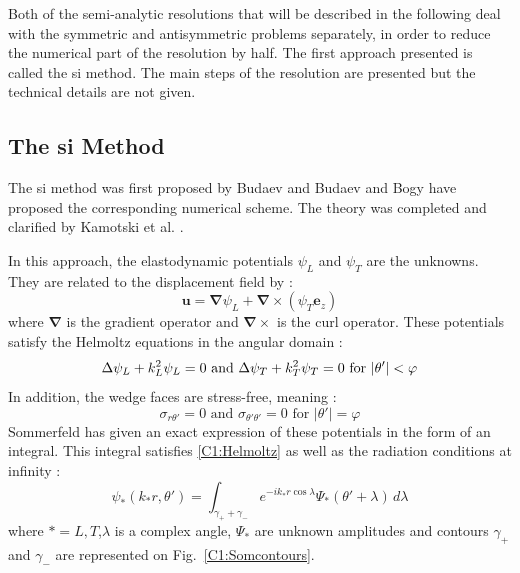 Both of the semi-analytic resolutions that will be described in the following deal with the symmetric and antisymmetric problems separately, in order to reduce the numerical part of the resolution by half. The first approach presented is called the \acrfull{si} method. The main steps of the resolution are presented but the technical details are not given.

\subsection{The \acrfull{si} Method}
The \acrfull{si} method was first proposed by Budaev \cite{BudaevBook,Budaev1,Budaev2} and Budaev and Bogy \cite{Rayleigh,Rayleigh2,Rayleigh3} have proposed the corresponding numerical scheme. The theory was completed and clarified by Kamotski et al. \cite{KamotskiFradkin}.

In this approach, the elastodynamic potentials $\psi_L$ and $\psi_T$ are the unknowns. They are related to the displacement field by :
\begin{equation}
\mathbf{u}=\mathbf{\nabla}\psi_L+\mathbf{\nabla}\times(\psi_T\mathbf{e}_z)
\label{C1:elastopotentials}
\end{equation}
where $\mathbf{\nabla}$ is the gradient operator and $\mathbf{\nabla}\times$ is the curl operator. These potentials satisfy the Helmoltz equations in the angular domain \cite{Achenbach} :
\begin{equation}
\Delta \psi_L+k_L^2\psi_L=0 \mbox{ and } \Delta \psi_T+k_T^2\psi_T=0 \rm \mbox{ for } |\theta'|<\varphi
\label{C1:Helmoltz}
\end{equation}
In addition, the wedge faces are stress-free, meaning :
\begin{equation}
\sigma_{r\theta'}=0 \mbox{ and } \sigma_{\theta'\theta'}=0 \mbox{ for } |\theta'|=\varphi
\label{C1:stresses}
\end{equation}
Sommerfeld \cite{Sommerfeld} has given an exact expression of these potentials in the form of an integral. This integral satisfies \eqref{C1:Helmoltz} as well as the radiation conditions at infinity \cite{SMtechnique} :
\begin{equation}
\psi_*(k_*r,\theta')=\int_{\gamma_++\gamma_-}e^{-ik_*r\cos\lambda}\Psi_*(\theta'+\lambda)\,d\lambda
\label{C1:Sommerfeld}
\end{equation}
where $*=L,T$,$\lambda$ is a complex angle, $\Psi_*$ are unknown amplitudes and contours $\gamma_+$ and $\gamma_-$ are represented on Fig.~\ref{C1:Somcontours}.

